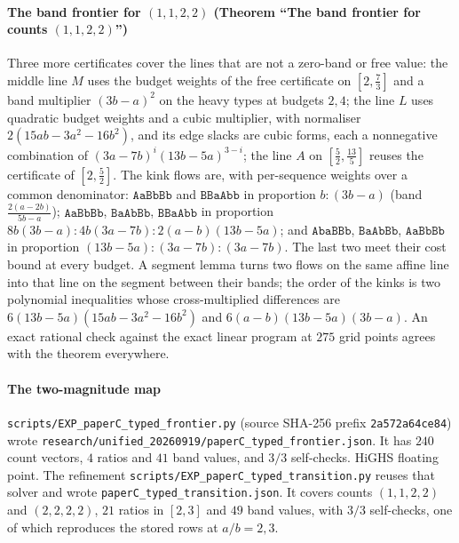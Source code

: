 \paragraph{The band frontier for $(1,1,2,2)$ (Theorem ``The band frontier for counts $(1,1,2,2)$'')}
Three more certificates cover the lines that are not a zero-band or free value: the middle line
$M$ uses the budget weights of the free certificate on $[2,\frac73]$ and a band multiplier $(3b-a)^2$
on the heavy types at budgets $2,4$; the line $L$ uses quadratic budget weights and a cubic
multiplier, with normaliser $2(15ab-3a^2-16b^2)$, and its edge slacks are cubic forms, each a
nonnegative combination of $(3a-7b)^i(13b-5a)^{3-i}$; the line $A$ on $[\frac52,\frac{13}5]$ reuses the
certificate of $[2,\frac52]$. The kink flows are, with per-sequence weights over a common
denominator: $\mathtt{AaBbBb}$ and $\mathtt{BBaAbb}$ in proportion $b:(3b-a)$ (band
$\frac{2(a-2b)}{5b-a}$); $\mathtt{AaBbBb}$, $\mathtt{BaAbBb}$, $\mathtt{BBaAbb}$ in proportion
$8b(3b-a):4b(3a-7b):2(a-b)(13b-5a)$; and $\mathtt{AbaBBb}$, $\mathtt{BaAbBb}$, $\mathtt{AaBbBb}$ in
proportion $(13b-5a):(3a-7b):(3a-7b)$. The last two meet their cost bound at every budget. A segment
lemma turns two flows on the same affine line into that line on the segment between their bands;
the order of the kinks is two polynomial inequalities whose cross-multiplied differences are
$6(13b-5a)(15ab-3a^2-16b^2)$ and $6(a-b)(13b-5a)(3b-a)$. An exact rational check against the exact
linear program at $275$ grid points agrees with the theorem everywhere.

\paragraph{The two-magnitude map} \texttt{scripts/EXP\_paperC\_typed\_frontier.py} (source
SHA-256 prefix \texttt{2a572a64ce84}) wrote
\texttt{research/unified\_20260919/paperC\_typed\_frontier.json}. It has $240$ count vectors,
$4$ ratios and $41$ band values, and $3/3$ self-checks. HiGHS floating point. The refinement
\texttt{scripts/EXP\_paperC\_typed\_transition.py} reuses that solver and wrote
\texttt{paperC\_typed\_transition.json}. It covers counts $(1,1,2,2)$ and $(2,2,2,2)$, $21$
ratios in $[2,3]$ and $49$ band values, with $3/3$ self-checks, one of which reproduces the
stored rows at $a/b=2,3$. \NUM{}

